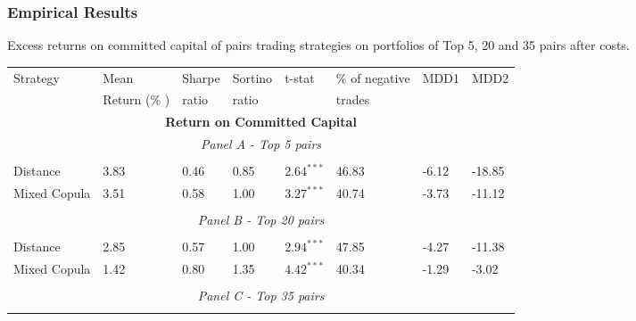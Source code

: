 \documentclass[pdf,9pt,xcolor=dvipsnames,hide notes]{beamer}
\begin{document}
\begin{frame}
	
	
	\frametitle{Empirical Results}
	\begin{threeparttable}[H]
		\centering \tiny
		\caption{Excess returns on committed capital of pairs trading strategies on portfolios of Top 5, 20 and 35 pairs after costs. }
		\begin{tabularx}{\textwidth}{@{\extracolsep{\fill}}llllllll@{}}
			\toprule
			Strategy & Mean  & Sharpe & Sortino & t-stat & \% of negative   & MDD1 & MDD2 \\
			& Return (\% ) & ratio &  ratio     &  &  trades     &       &  \\
			\midrule
			\multicolumn{8}{c}{\textbf{Return on Committed Capital}} \\
			\multicolumn{8}{c}{\textit{Panel A - Top 5 pairs}} \\
			&       &       &       &       &       &       &  \\
			Distance & \cellcolor{celadon} 3.83  & 0.46  & 0.85  & $2.64^{***}$  & 46.83 & -6.12    & -18.85 \\
			Mixed Copula & 3.51  & \cellcolor{corn} 0.58  & 1.00  & \cellcolor{corn} $3.27^{***}$  & \cellcolor{corn} 40.74 & \cellcolor{corn} -3.73  & \cellcolor{corn} -11.12 \\
			\multicolumn{1}{r}{} & \multicolumn{1}{r}{} & \multicolumn{1}{r}{} & \multicolumn{1}{r}{} & \multicolumn{1}{r}{} & \multicolumn{1}{r}{} & \multicolumn{1}{r}{} & \multicolumn{1}{r}{} \\
			\multicolumn{8}{c}{\textit{Panel B - Top 20 pairs}} \\
			&       &       &       &       &       &       &  \\
			Distance & \cellcolor{celadon} 2.85  & 0.57  & 1.00  & $ 2.94^{***}$  & 47.85 & -4.27  & -11.38 \\
			Mixed Copula  & 1.42  & \cellcolor{corn} 0.80  & 1.35  & $4.42^{***}$  & 40.34  & -1.29  & -3.02  \\
			\multicolumn{1}{r}{} & \multicolumn{1}{r}{} & \multicolumn{1}{r}{} & \multicolumn{1}{r}{} & \multicolumn{1}{r}{} & \multicolumn{1}{r}{} & \multicolumn{1}{r}{} & \multicolumn{1}{r}{} \\
			\multicolumn{8}{c}{\textit{Panel C - Top 35 pairs}} \\
			&       &       &       &       &       &       &  \\

\end{tabularx}
\end{threeparttable}
\end{frame}
\end{document}
